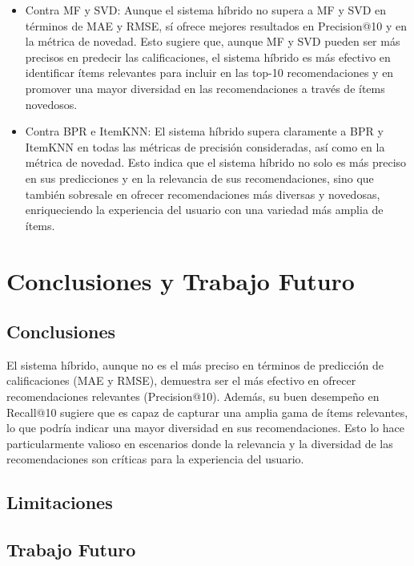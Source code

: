 \documentclass[a4paper,12pt]{report}
\begin{document}
    \begin{itemize}
        \item Contra MF y SVD: Aunque el sistema híbrido no supera a MF y SVD en términos de MAE y RMSE, sí ofrece mejores resultados en Precision@10 y en la métrica de novedad. Esto sugiere que, aunque MF y SVD pueden ser más precisos en predecir las calificaciones, el sistema híbrido es más efectivo en identificar ítems relevantes para incluir en las top-10 recomendaciones y en promover una mayor diversidad en las recomendaciones a través de ítems novedosos.
        \item Contra BPR e ItemKNN: El sistema híbrido supera claramente a BPR y ItemKNN en todas las métricas de precisión consideradas, así como en la métrica de novedad. Esto indica que el sistema híbrido no solo es más preciso en sus predicciones y en la relevancia de sus recomendaciones, sino que también sobresale en ofrecer recomendaciones más diversas y novedosas, enriqueciendo la experiencia del usuario con una variedad más amplia de ítems.
    \end{itemize}
        
\chapter{Conclusiones y Trabajo Futuro}
    \section{Conclusiones}

    El sistema híbrido, aunque no es el más preciso en términos de predicción de calificaciones (MAE y RMSE), demuestra ser el más efectivo en ofrecer recomendaciones relevantes (Precision@10). Además, su buen desempeño en Recall@10 sugiere que es capaz de capturar una amplia gama de ítems relevantes, lo que podría indicar una mayor diversidad en sus recomendaciones. Esto lo hace particularmente valioso en escenarios donde la relevancia y la diversidad de las recomendaciones son críticas para la experiencia del usuario.
    \section{Limitaciones}
    \section{Trabajo Futuro}






\end{document}
